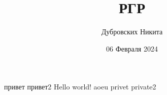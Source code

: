 \documentclass{article}
\title{РГР}
\author{Дубровских Никита}
\date{06 Февраля 2024}
\begin{document}
   \maketitle
   привет
   привет2
   Hello world! aoeu
   privet
   private2
\end{document}
